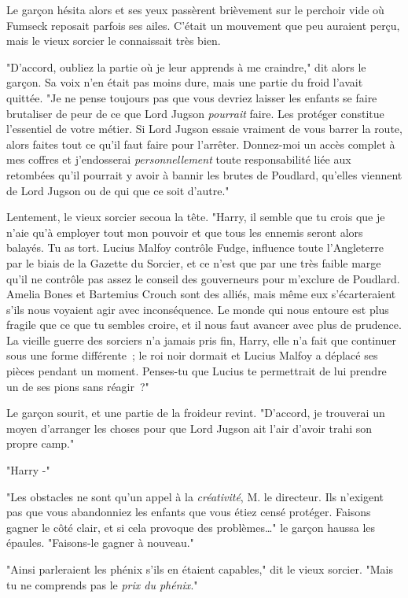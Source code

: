 Le garçon hésita alors et ses yeux passèrent brièvement sur le perchoir vide où Fumseck reposait parfois ses ailes. C'était un mouvement que peu auraient perçu, mais le vieux sorcier le connaissait très bien.

"D'accord, oubliez la partie où je leur apprends à me craindre," dit alors le garçon. Sa voix n'en était pas moins dure, mais une partie du froid l'avait quittée. "Je ne pense toujours pas que vous devriez laisser les enfants se faire brutaliser de peur de ce que Lord Jugson \emph{pourrait} faire. Les protéger constitue l'essentiel de votre métier. Si Lord Jugson essaie vraiment de vous barrer la route, alors faites tout ce qu'il faut faire pour l'arrêter. Donnez-moi un accès complet à mes coffres et j'endosserai \emph{personnellement} toute responsabilité liée aux retombées qu'il pourrait y avoir à bannir les brutes de Poudlard, qu'elles viennent de Lord Jugson ou de qui que ce soit d'autre."

Lentement, le vieux sorcier secoua la tête. "Harry, il semble que tu crois que je n'aie qu'à employer tout mon pouvoir et que tous les ennemis seront alors balayés. Tu as tort. Lucius Malfoy contrôle Fudge, influence toute l'Angleterre par le biais de la Gazette du Sorcier, et ce n'est que par une très faible marge qu'il ne contrôle pas assez le conseil des gouverneurs pour m'exclure de Poudlard. Amelia Bones et Bartemius Crouch sont des alliés, mais même eux s'écarteraient s'ils nous voyaient agir avec inconséquence. Le monde qui nous entoure est plus fragile que ce que tu sembles croire, et il nous faut avancer avec plus de prudence. La vieille guerre des sorciers n'a jamais pris fin, Harry, elle n'a fait que continuer sous une forme différente~; le roi noir dormait et Lucius Malfoy a déplacé ses pièces pendant un moment. Penses-tu que Lucius te permettrait de lui prendre un de ses pions sans réagir~?"

Le garçon sourit, et une partie de la froideur revint. "D'accord, je trouverai un moyen d'arranger les choses pour que Lord Jugson ait l'air d'avoir trahi son propre camp."

"Harry -"

"Les obstacles ne sont qu'un appel à la \emph{créativité}, M. le directeur. Ils n'exigent pas que vous abandonniez les enfants que vous étiez censé protéger. Faisons gagner le côté clair, et si cela provoque des problèmes…" le garçon haussa les épaules. "Faisons-le gagner à nouveau."

"Ainsi parleraient les phénix s'ils en étaient capables," dit le vieux sorcier. "Mais tu ne comprends pas le \emph{prix du phénix}."

